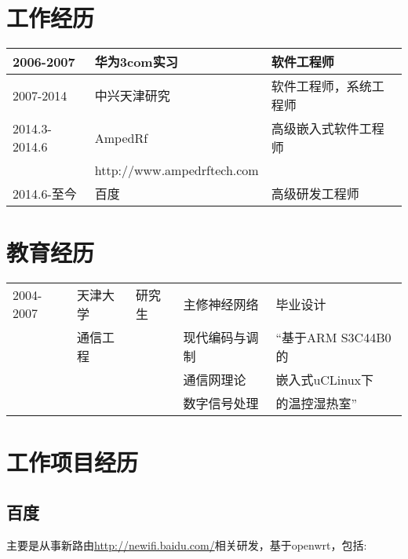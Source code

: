 \documentclass[titlepage]{article}
\begin{document}
\section{工作经历}

\begin{tabular}{|l|l|l|}
\hline
2006-2007 & 华为3com实习 & 软件工程师 \\
\hline
2007-2014 & 	中兴天津研究 & 	软件工程师，系统工程师 \\
\hline
2014.3-2014.6 & 	AmpedRf  & 	高级嵌入式软件工程师 \\
             &  http://www.ampedrftech.com &                         \\
\hline
2014.6-至今 & 百度 & 高级研发工程师 \\
\hline
\end{tabular}

\section{教育经历}

\begin{tabular}{|l|l|l|l|l|}
\hline
2004-2007 & 天津大学  & 研究生 &  主修神经网络 & 毕业设计 \\
          & 通信工程  &        & 现代编码与调制&“基于ARM S3C44B0的\\
          &           &        & 通信网理论    & 嵌入式uCLinux下\\
          &           &        & 数字信号处理  &的温控湿热室”\\
\hline
\end{tabular}


\section{工作项目经历}

\subsection{百度}

主要是从事新路由\url{http://newifi.baidu.com/}相关研发，基于openwrt，包括:
\end{document}
